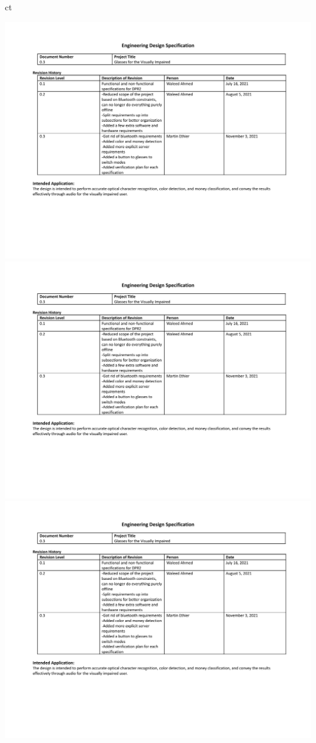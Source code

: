 ct\documentclass[a4paper,11pt]{article}
\begin{document}
\begin{landscape}
\begin{center}
        \includegraphics[page=3,width={0.86\linewidth}]{pdf/eds_0.3.pdf}
        \newpage
        \includegraphics[page=4,width={0.86\linewidth}]{pdf/eds_0.3.pdf}
        \newpage
        \includegraphics[page=5,width={0.86\linewidth}]{pdf/eds_0.3.pdf}
    \end{center}
    

\end{landscape}
\end{document}

